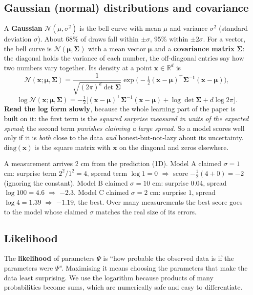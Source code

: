 \documentclass[11pt,a4paper]{article}
\newcommand{\mmu}{\boldsymbol{\mu}}
\newcommand{\SSigma}{\boldsymbol{\Sigma}}
\begin{document}
\subsection{Gaussian (normal) distributions and covariance}
A \textbf{Gaussian} $\mathcal N(\mu,\sigma^2)$ is the bell curve with mean $\mu$ and variance $\sigma^2$ (standard deviation $\sigma$). About 68\% of draws fall within $\pm\sigma$, 95\% within $\pm2\sigma$.
For a vector, the bell curve is $\mathcal N(\mmu,\SSigma)$ with a mean vector $\mmu$ and a \textbf{covariance matrix} $\SSigma$: the diagonal holds the variance of each number, the off-diagonal entries say how two numbers vary together.
Its density at a point $\mathbf x\in\mathbb R^d$ is
\[
\mathcal N(\mathbf x;\mmu,\SSigma)=\frac{1}{\sqrt{(2\pi)^d\det\SSigma}}\exp\!\Big(-\tfrac12(\mathbf x-\mmu)^\top\SSigma^{-1}(\mathbf x-\mmu)\Big),
\]
\[
\log\mathcal N(\mathbf x;\mmu,\SSigma)=-\tfrac12\Big[(\mathbf x-\mmu)^\top\SSigma^{-1}(\mathbf x-\mmu)+\log\det\SSigma+d\log 2\pi\Big].
\]
\textbf{Read the log form slowly}, because the whole learning part of the paper is built on it: the first term is the \emph{squared surprise measured in units of the expected spread};
the second term \emph{punishes claiming a large spread}. So a model scores well only if it is \emph{both} close to the data \emph{and} honest-but-not-lazy about its uncertainty.
$\mathrm{diag}(\mathbf x)$ is the square matrix with $\mathbf x$ on the diagonal and zeros elsewhere.

\begin{toy}
A measurement arrives 2 cm from the prediction (1D). Model A claimed $\sigma=1$ cm: surprise term $2^2/1^2=4$, spread term $\log 1=0$ $\Rightarrow$ score $-\tfrac12(4+0)=-2$ (ignoring the constant).
Model B claimed $\sigma=10$ cm: surprise $0.04$, spread $\log 100=4.6$ $\Rightarrow$ $-2.3$. Model C claimed $\sigma=2$ cm: surprise $1$, spread $\log 4=1.39$ $\Rightarrow$ $-1.19$, the best.
Over many measurements the best score goes to the model whose claimed $\sigma$ matches the real size of its errors.
\end{toy}

\subsection{Likelihood}
The \textbf{likelihood} of parameters $\Psi$ is ``how probable the observed data is if the parameters were $\Psi$''. Maximising it means choosing the parameters that make the data least surprising.
We use the logarithm because products of many probabilities become sums, which are numerically safe and easy to differentiate.
\end{document}
